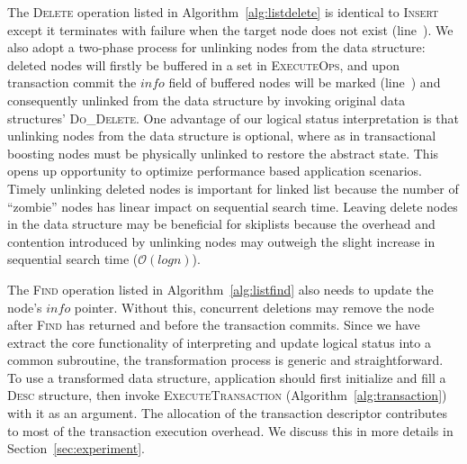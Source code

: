 \documentclass[10pt,conference,compsocconf]{IEEEtran}
\begin{document}
The \textsc{Delete} operation listed in Algorithm~\ref{alg:listdelete} is identical to \textsc{Insert} except it terminates with failure when the target node does not exist (line~).
We also adopt a two-phase process for unlinking nodes from the data structure: deleted nodes will firstly be buffered in a set in \textsc{ExecuteOps}, and upon transaction commit the $info$ field of buffered nodes will be marked (line~) and consequently unlinked from the data structure by invoking original data structures' \textsc{Do\_Delete}.
One advantage of our logical status interpretation is that unlinking nodes from the data structure is optional, where as in transactional boosting nodes must be physically unlinked to restore the abstract state. 
This opens up opportunity to optimize performance based application scenarios.
Timely unlinking deleted nodes is important for linked list because the number of ``zombie'' nodes has linear impact on sequential search time.
Leaving delete nodes in the data structure may be beneficial for skiplists because the overhead and contention introduced by unlinking nodes may outweigh the slight increase in sequential search time ($\mathcal{O}(log{}n)$).

The \textsc{Find} operation listed in Algorithm~\ref{alg:listfind} also needs to update the node's $info$ pointer.
Without this, concurrent deletions may remove the node after \textsc{Find} has returned and before the transaction commits.
Since we have extract the core functionality of interpreting and update logical status into a common subroutine, the transformation process is generic and straightforward.
To use a transformed data structure, application should first initialize and fill a \textsc{Desc} structure, then invoke \textsc{ExecuteTransaction} (Algorithm~\ref{alg:transaction}) with it as an argument.
The allocation of the transaction descriptor contributes to most of the transaction execution overhead.
We discuss this in more details in Section~\ref{sec:experiment}.
\end{document}
